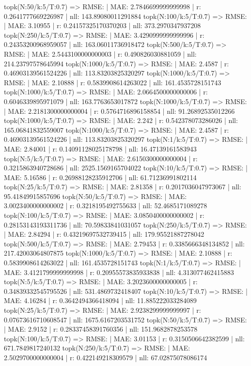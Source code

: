 topk(N:50/k:5/T:0.7) => RMSE: | MAE: 2.7846699999999998 | r: 0.2641777669226987 | nll: 143.89080011291884
topk(N:100/k:5/T:0.7) => RMSE: | MAE: 3.10955 | r: 0.24157325170370203 | nll: 373.2970347937208
topk(N:250/k:5/T:0.7) => RMSE: | MAE: 3.4290999999999996 | r: 0.24353200968959057 | nll: 163.06011736918472
topk(N:500/k:5/T:0.7) => RMSE: | MAE: 2.5443100000000003 | r: 0.490826030881059 | nll: 214.23797578645994
topk(N:1000/k:5/T:0.7) => RMSE: | MAE: 2.4587 | r: 0.46903139561524226 | nll: 113.83203825320297
topk(N:1000/k:5/T:0.7) => RMSE: | MAE: 2.10888 | r: 0.5839908614263022 | nll: 161.4535728151743
topk(N:1000/k:5/T:0.7) => RMSE: | MAE: 2.0664500000000006 | r: 0.6046339895971079 | nll: 163.7763653017872
topk(N:1000/k:5/T:0.7) => RMSE: | MAE: 2.2181300000000004 | r: 0.5764716896158854 | nll: 91.26892535012266
topk(N:1000/k:5/T:0.7) => RMSE: | MAE: 2.242 | r: 0.542378073286026 | nll: 165.06841832559007
topk(N:1000/k:5/T:0.7) => RMSE: | MAE: 2.4587 | r: 0.46903139561524226 | nll: 113.83203825320297
topk(N:1/k:5/T:0.7) => RMSE: | MAE: 2.84001 | r: 0.14091128025178798 | nll: 16.47139161583943
topk(N:5/k:5/T:0.7) => RMSE: | MAE: 2.6150300000000004 | r: 0.3215863940728686 | nll: 2525.1569165704022
topk(N:10/k:5/T:0.7) => RMSE: | MAE: 5.16586 | r: 0.26988128235912706 | nll: 61.71236991802114
topk(N:25/k:5/T:0.7) => RMSE: | MAE: 2.81358 | r: 0.2017036047973067 | nll: 95.41849915857696
topk(N:50/k:5/T:0.7) => RMSE: | MAE: 3.0023400000000002 | r: 0.3218195492755633 | nll: 52.4685171089278
topk(N:100/k:5/T:0.7) => RMSE: | MAE: 3.0850400000000002 | r: 0.28153143193311736 | nll: 70.59833841031057
topk(N:250/k:5/T:0.7) => RMSE: | MAE: 2.84294 | r: 0.43219697532739415 | nll: 179.95521887278042
topk(N:500/k:5/T:0.7) => RMSE: | MAE: 2.79453 | r: 0.3385666348134852 | nll: 217.42003064807875
topk(N:1000/k:5/T:0.7) => RMSE: | MAE: 2.10888 | r: 0.5839908614263022 | nll: 161.4535728151743
topk(N:1/k:5/T:0.7) => RMSE: | MAE: 3.4121799999999998 | r: 0.20955573835933838 | nll: 4.313077462415883
topk(N:5/k:5/T:0.7) => RMSE: | MAE: 3.2023600000000005 | r: 0.34839332545795526 | nll: 531.4869732418407
topk(N:10/k:5/T:0.7) => RMSE: | MAE: 4.16284 | r: 0.3642494366418094 | nll: 11.885222033284089
topk(N:25/k:5/T:0.7) => RMSE: | MAE: 2.9238299999999997 | r: 0.07673616710608547 | nll: 1675.6167203531752
topk(N:50/k:5/T:0.7) => RMSE: | MAE: 2.9152 | r: 0.28337458391760356 | nll: 151.9682878253578
topk(N:100/k:5/T:0.7) => RMSE: | MAE: 3.01153 | r: 0.3150506642382599 | nll: 671.7849817240132
topk(N:250/k:5/T:0.7) => RMSE: | MAE: 2.5029700000000004 | r: 0.422149218309579 | nll: 67.02875078086174
